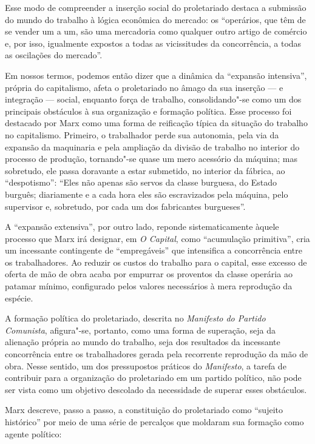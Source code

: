 Esse modo de compreender a inserção social do proletariado destaca a
submissão do mundo do trabalho à lógica econômica do mercado: os
“operários, que têm de se vender um a um, são uma mercadoria como
qualquer outro artigo de comércio e, por isso, igualmente expostos a
todas as vicissitudes da concorrência, a todas as oscilações do
mercado”.

Em nossos termos, podemos então dizer que a dinâmica da “expansão
intensiva”, própria do capitalismo, afeta o proletariado no âmago da sua
inserção --- e integração --- social, enquanto força de trabalho,
consolidando"-se como um dos principais obstáculos à sua organização e
formação política. Esse processo foi destacado por Marx como uma forma
de reificação típica da situação do trabalho no capitalismo. Primeiro,
o trabalhador perde sua autonomia, pela via da expansão da maquinaria e
pela ampliação da divisão de trabalho no interior do processo de
produção, tornando"-se quase um mero acessório da máquina; mas
sobretudo, ele passa doravante a estar submetido, no interior da
fábrica, ao “despotismo”: “Eles não apenas são servos da classe
burguesa, do Estado burguês; diariamente e a cada hora eles são
escravizados pela máquina, pelo supervisor e, sobretudo, por cada um
dos fabricantes burgueses”.

A “expansão extensiva”, por outro lado, reponde sistematicamente àquele
processo que Marx irá designar, em \textit{O Capital}, como “acumulação
primitiva”, cria um incessante contingente de “empregáveis” que
intensifica a concorrência entre os trabalhadores. Ao reduzir os custos
do trabalho para o capital, esse excesso de oferta de mão de obra
acaba por empurrar os proventos da classe operária ao patamar mínimo,
configurado pelos valores necessários à mera reprodução da espécie.

A formação política do proletariado, descrita no \textit{Manifesto do
Partido Comunista}, afigura"-se, portanto, como uma forma de superação,
seja da alienação própria ao mundo do trabalho, seja dos resultados da
incessante concorrência entre os trabalhadores gerada pela recorrente
reprodução da mão de obra. Nesse sentido, um dos pressupostos
práticos do \textit{Manifesto}, a tarefa de contribuir para a
organização do proletariado em um partido político, não pode ser vista
como um objetivo descolado da necessidade de superar esses obstáculos.

Marx descreve, passo a passo, a constituição do proletariado como
“sujeito histórico” por meio de uma série de percalços que moldaram sua
formação como agente político: 

